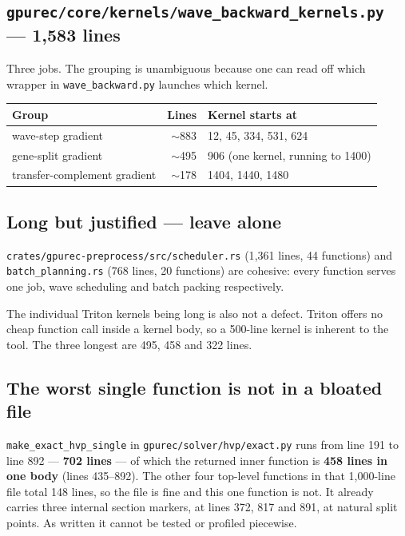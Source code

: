 \documentclass[11pt]{article}
\newcommand{\loc}[1]{\nolinkurl{#1}}
\newcommand{\dir}[1]{\nolinkurl{#1}}
\begin{document}
\subsection{\texorpdfstring{\dir{gpurec/core/kernels/wave\_backward\_kernels.py}}{wave\_backward\_kernels.py} --- 1{,}583 lines}

Three jobs.  The grouping is unambiguous because one can read off which wrapper
in \dir{wave\_backward.py} launches which kernel.

\begin{center}
\begin{tabular}{@{}lrl@{}}
\toprule
Group & Lines & Kernel starts at \\
\midrule
wave-step gradient           & $\sim$883 & 12, 45, 334, 531, 624 \\
gene-split gradient          & $\sim$495 & 906 (one kernel, running to 1400) \\
transfer-complement gradient & $\sim$178 & 1404, 1440, 1480 \\
\bottomrule
\end{tabular}
\end{center}

\subsection{Long but justified --- leave alone}

\dir{crates/gpurec-preprocess/src/scheduler.rs} (1{,}361 lines, 44 functions)
and \dir{batch\_planning.rs} (768 lines, 20 functions) are cohesive: every
function serves one job, wave scheduling and batch packing respectively.

The individual Triton kernels being long is also not a defect.  Triton offers no
cheap function call inside a kernel body, so a 500-line kernel is inherent to
the tool.  The three longest are 495, 458 and 322 lines.

\subsection{The worst single function is not in a bloated file}

\texttt{make\_exact\_hvp\_single} in \loc{gpurec/solver/hvp/exact.py} runs from
line 191 to line 892 --- \textbf{702 lines} --- of which the returned inner
function is \textbf{458 lines in one body} (lines 435--892).  The other four
top-level functions in that 1,000-line file total 148 lines, so the file is
fine and this one function is not.  It already carries three internal section
markers, at lines 372, 817 and 891, at natural split points.  As written it
cannot be tested or profiled piecewise.
\end{document}
